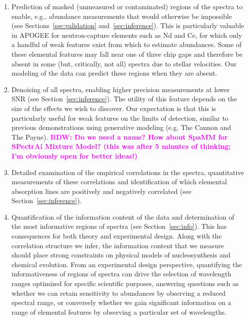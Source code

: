 \documentclass[a4paper,fleqn,usenatbib]{mnras}
\newcommand{\bdw}[1]{\textbf{\textcolor{magenta}{BDW: #1}}}
\newcommand{\smf}[1]{\textbf{\textcolor{blue}{SMF: #1}}}
\begin{document}
\begin{enumerate}
\item Prediction of masked (unmeasured or contaminated) regions of the spectra to enable, e.g., abundance measurements that would otherwise be impossible (see Sections~\ref{sec:validation} and~\ref{sec:inference}). This is particularly valuable in APOGEE for neutron-capture elements such as Nd and Ce, for which only a handful of weak features exist from which to estimate abundances. %
Some of these elemental features may fall near one of three chip gaps and therefore be absent in some (but, critically, not all) spectra due to stellar velocities. Our modeling of the data can predict these regions when they are absent. 
\item Denoising of all spectra, enabling higher precision measurements at lower SNR (see Section~\ref{sec:inference}). The utility of this feature depends on the size of the effects we wish to discover. Our expectation is that this is particularly useful for weak features on the limits of detection, similar to previous demonstrations using generative modeling (e.g. The Cannon and The Payne).  \bdw{Do we need a name? How about SpaMM for SPectrAl Mixture Model? (this was after 5 minutes of thinking; I'm obviously open for better ideas!)}
\item Detailed examination of the empirical correlations in the spectra, quantitative measurements of these correlations and identification of which elemental absorption lines are positively and negatively correlated (see Section~\ref{sec:inference}). %
\item Quantification of the information content of the data and determination of the most informative regions of spectra (see Section~\ref{sec:info}). This has consequences for both theory and experimental design. Along with the correlation structure we infer, the information content that we measure should place strong constraints on physical models of nucleosynthesis and chemical evolution. From an experimental design perspective, quantifying the informativeness of regions of spectra can drive the selection of wavelength ranges optimized for specific scientific purposes, answering questions such as whether we can retain sensitivity to abundances by observing a reduced spectral range, or conversely whether we gain significant information on a range of elemental features by observing a particular set of wavelengths.
\end{enumerate}
\end{document}
